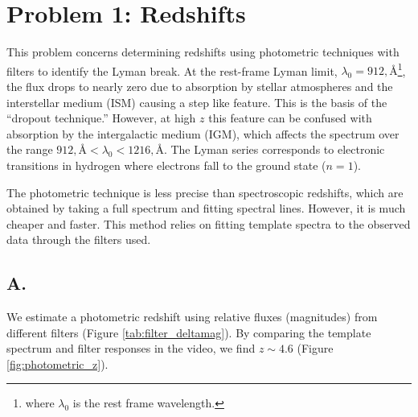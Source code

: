 
\section*{Problem 1: Redshifts}
This problem concerns determining redshifts using photometric techniques with filters to identify the Lyman break. At the rest-frame Lyman limit, $\lambda_0 = 912 , \text{\AA}$\footnote{where $\lambda_0$ is the rest frame wavelength.}, the flux drops to nearly zero due to absorption by stellar atmospheres and the interstellar medium (ISM) causing a step like feature. This is the basis of the ``dropout technique.'' However, at high $z$ this feature can be confused with absorption by the intergalactic medium (IGM), which affects the spectrum over the range $912 , \text{\AA} < \lambda_0 < 1216 , \text{\AA}$. The Lyman series corresponds to electronic transitions in hydrogen where electrons fall to the ground state ($n=1$). 

The photometric technique is less precise than spectroscopic redshifts, which are obtained by taking a full spectrum and fitting spectral lines. However, it is much cheaper and faster. This method relies on fitting template spectra to the observed data through the filters used.

\subsection*{A.}
We estimate a photometric redshift using relative fluxes (magnitudes) from different filters (Figure \ref{tab:filter_deltamag}). By comparing the template spectrum and filter responses in the video, we find $z \sim 4.6$ (Figure \ref{fig:photometric_z}).

